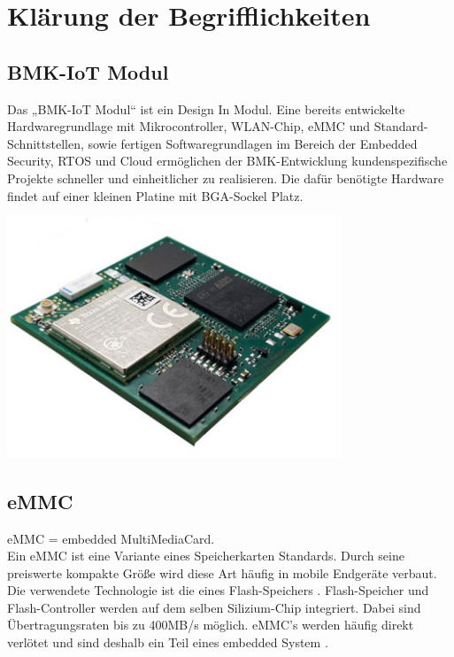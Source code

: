 

\section{Klärung der Begrifflichkeiten}

\subsection{BMK-IoT Modul}
Das „BMK-IoT Modul“ ist ein Design In Modul. Eine bereits entwickelte Hardwaregrundlage mit Mikrocontroller, WLAN-Chip, eMMC und Standard-Schnittstellen, sowie fertigen Softwaregrundlagen im Bereich der Embedded Security, RTOS und Cloud ermöglichen der BMK-Entwicklung kundenspezifische Projekte schneller und einheitlicher zu realisieren.
Die dafür benötigte Hardware findet auf einer kleinen Platine mit BGA-Sockel Platz. 

\begin{center}
\includegraphics[width=10cm]{Bilder/BMK-IOT-MODUL.png}
\end{center}

\subsection{eMMC}
eMMC = embedded MultiMediaCard.
\\
Ein \glqq eMMC \grqq{} ist eine Variante eines Speicherkarten Standards. Durch seine preiswerte kompakte Größe wird diese Art häufig in mobile Endgeräte verbaut. Die verwendete Technologie ist die eines Flash-Speichers . Flash-Speicher und Flash-Controller werden auf dem selben Silizium-Chip integriert. Dabei sind Übertragungsraten bis zu 400MB/s möglich. eMMC's werden häufig direkt verlötet und sind deshalb ein Teil eines \glqq embedded System \grqq{}.


